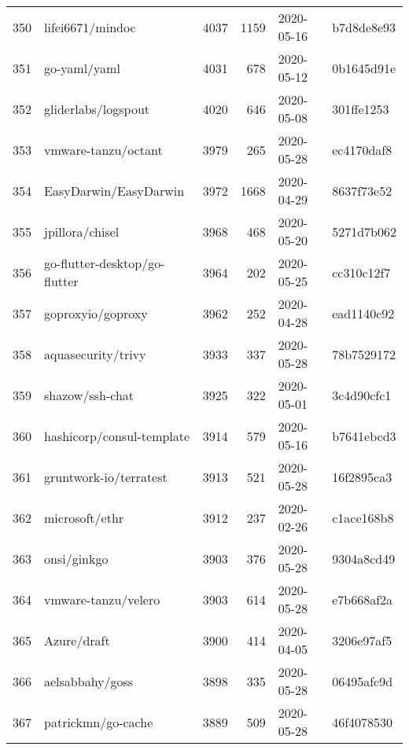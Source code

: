 \begin{longtable}{llrrll}
    350 &                                   lifei6671/mindoc &   4037 &   1159 & 2020-05-16 &  b7d8de8e93 \\
    351 &                                       go-yaml/yaml &   4031 &    678 & 2020-05-12 &  0b1645d91e \\
    352 &                                gliderlabs/logspout &   4020 &    646 & 2020-05-08 &  301ffe1253 \\
    353 &                                vmware-tanzu/octant &   3979 &    265 & 2020-05-28 &  ec4170daf8 \\
    354 &                              EasyDarwin/EasyDarwin &   3972 &   1668 & 2020-04-29 &  8637f73e52 \\
    355 &                                    jpillora/chisel &   3968 &    468 & 2020-05-20 &  5271d7b062 \\
    356 &                      go-flutter-desktop/go-flutter &   3964 &    202 & 2020-05-25 &  cc310c12f7 \\
    357 &                                  goproxyio/goproxy &   3962 &    252 & 2020-04-28 &  ead1140c92 \\
    358 &                                 aquasecurity/trivy &   3933 &    337 & 2020-05-28 &  78b7529172 \\
    359 &                                    shazow/ssh-chat &   3925 &    322 & 2020-05-01 &  3c4d90cfc1 \\
    360 &                          hashicorp/consul-template &   3914 &    579 & 2020-05-16 &  b7641ebcd3 \\
    361 &                             gruntwork-io/terratest &   3913 &    521 & 2020-05-28 &  16f2895ca3 \\
    362 &                                     microsoft/ethr &   3912 &    237 & 2020-02-26 &  c1ace168b8 \\
    363 &                                        onsi/ginkgo &   3903 &    376 & 2020-05-28 &  9304a8cd49 \\
    364 &                                vmware-tanzu/velero &   3903 &    614 & 2020-05-28 &  e7b668af2a \\
    365 &                                        Azure/draft &   3900 &    414 & 2020-04-05 &  3206e97af5 \\
    366 &                                    aelsabbahy/goss &   3898 &    335 & 2020-05-28 &  06495afc9d \\
    367 &                                 patrickmn/go-cache &   3889 &    509 & 2020-05-28 &  46f4078530 \\

\end{longtable}
